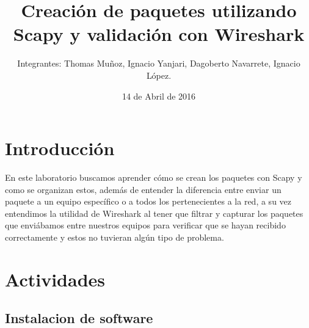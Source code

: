 \documentclass{udpreport}
\title{Creación de paquetes utilizando Scapy y validación con Wireshark}
\author{Integrantes: Thomas Muñoz, Ignacio Yanjari, Dagoberto Navarrete, Ignacio López.}
\date{14 de Abril de 2016}
\begin{document}
\maketitle
\tableofcontents
\chapter{Introducción}
	En este laboratorio buscamos aprender cómo se crean los paquetes con Scapy y como se organizan estos, además de entender la
	diferencia entre enviar un paquete a un equipo específico o a todos los pertenecientes a la red, a su vez entendimos la
	utilidad de Wireshark al tener que filtrar y capturar los paquetes que enviábamos entre nuestros equipos para verificar que se
	hayan recibido correctamente y estos no tuvieran algún tipo de problema.
\chapter{Actividades}
	\section{Instalacion de software}
\end{document}
